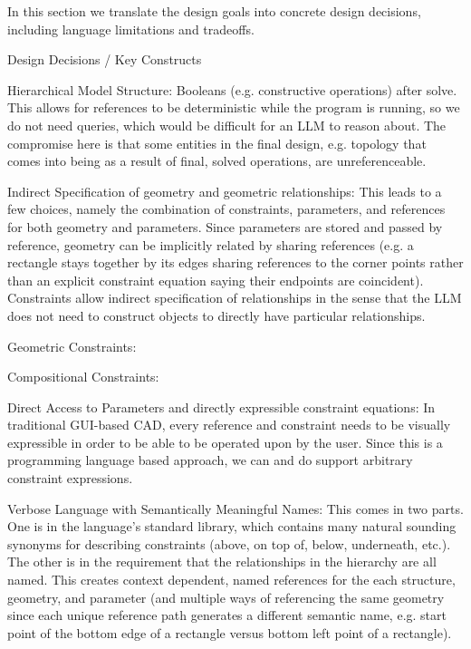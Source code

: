 {%
% 
%

In this section we translate the design goals into concrete design decisions, including language limitations and tradeoffs.

Design Decisions / Key Constructs

Hierarchical Model Structure:
Booleans (e.g. constructive operations) after solve. This allows for references to be deterministic while the program is running, so we do not need queries, which would be difficult for an LLM to reason about. The compromise here is that some entities in the final design, e.g. topology that comes into being as a result of final, solved operations, are unreferenceable.

Indirect Specification of geometry and geometric relationships:
This leads to a few choices, namely the combination of constraints, parameters, and references for both geometry and parameters. Since parameters are stored and passed by reference, geometry can be implicitly related by sharing references (e.g. a rectangle stays together by its edges sharing references to the corner points rather than an explicit constraint equation saying their endpoints are coincident). Constraints allow indirect specification of relationships in the sense that the LLM does not need to construct objects to directly have particular relationships.

Geometric Constraints:

Compositional Constraints:

Direct Access to Parameters and directly expressible constraint equations:
In traditional GUI-based CAD, every reference and constraint needs to be visually expressible in order to be able to be operated upon by the user. Since this is a programming language based approach, we can and do support arbitrary constraint expressions.

Verbose Language with Semantically Meaningful Names:
This comes in two parts. One is in the language's standard library, which contains many natural sounding synonyms for describing constraints (above, on top of, below, underneath, etc.). The other is in the requirement that the relationships in the hierarchy are all named. This creates context dependent, named references for the each structure, geometry, and parameter (and multiple ways of referencing the same geometry since each unique reference path generates a different semantic name, e.g. start point of the bottom edge of a rectangle versus bottom left point of a rectangle).

}
